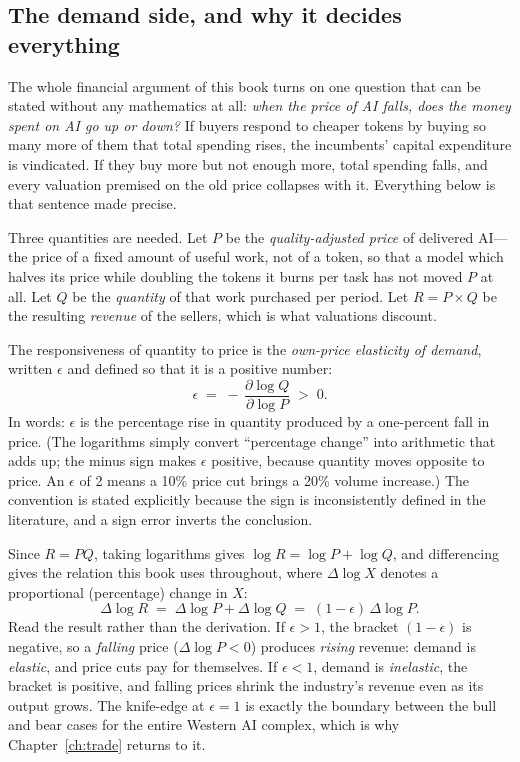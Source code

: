 \subsection{The demand side, and why it decides everything}
\label{sec:demandside}

The whole financial argument of this book turns on one question that can be stated without any mathematics at all: \emph{when the price of AI falls, does the money spent on AI go up or down?} If buyers respond to cheaper tokens by buying so many more of them that total spending rises, the incumbents' capital expenditure is vindicated. If they buy more but not enough more, total spending falls, and every valuation premised on the old price collapses with it. Everything below is that sentence made precise.

Three quantities are needed. Let $P$ be the \emph{quality-adjusted price} of delivered AI---the price of a fixed amount of useful work, not of a token, so that a model which halves its price while doubling the tokens it burns per task has not moved $P$ at all. Let $Q$ be the \emph{quantity} of that work purchased per period. Let $R = P \times Q$ be the resulting \emph{revenue} of the sellers, which is what valuations discount.

The responsiveness of quantity to price is the \emph{own-price elasticity of demand}, written $\epsilon$ and defined so that it is a positive number:
\[
\epsilon \;=\; -\,\frac{\partial \log Q}{\partial \log P} \;>\; 0 .
\]
In words: $\epsilon$ is the percentage rise in quantity produced by a one-percent fall in price. (The logarithms simply convert ``percentage change'' into arithmetic that adds up; the minus sign makes $\epsilon$ positive, because quantity moves opposite to price. An $\epsilon$ of 2 means a 10\% price cut brings a 20\% volume increase.) The convention is stated explicitly because the sign is inconsistently defined in the literature, and a sign error inverts the conclusion.

Since $R = PQ$, taking logarithms gives $\log R = \log P + \log Q$, and differencing gives the relation this book uses throughout, where $\Delta \log X$ denotes a proportional (percentage) change in $X$:
\[
\Delta \log R \;=\; \Delta \log P + \Delta \log Q \;=\; (1-\epsilon)\,\Delta \log P .
\]
Read the result rather than the derivation. If $\epsilon > 1$, the bracket $(1-\epsilon)$ is negative, so a \emph{falling} price ($\Delta \log P < 0$) produces \emph{rising} revenue: demand is \emph{elastic}, and price cuts pay for themselves. If $\epsilon < 1$, demand is \emph{inelastic}, the bracket is positive, and falling prices shrink the industry's revenue even as its output grows. The knife-edge at $\epsilon = 1$ is exactly the boundary between the bull and bear cases for the entire Western AI complex, which is why Chapter~\ref{ch:trade} returns to it.

